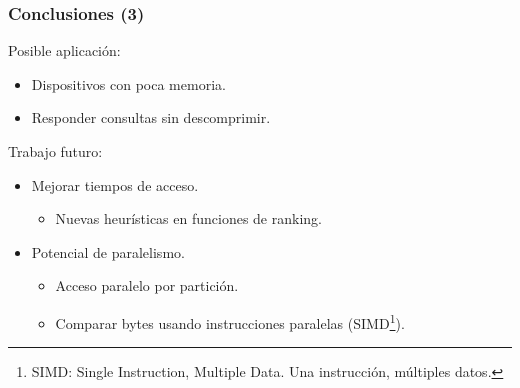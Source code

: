 \begin{frame}
\frametitle{Conclusiones (3)}

Posible aplicación:
\begin{itemize}
	\item Dispositivos con poca memoria.
	\item Responder consultas sin descomprimir.
\end{itemize}

Trabajo futuro:
\begin{itemize}
	\item Mejorar tiempos de acceso.
		\begin{itemize}
			\footnotesize
			\item Nuevas heurísticas en funciones de ranking.
		\end{itemize}
	\item Potencial de paralelismo.
		\begin{itemize}
			\footnotesize
			\item Acceso paralelo por partición.
			\item Comparar bytes usando instrucciones paralelas (SIMD\footnote{SIMD: Single Instruction, Multiple Data. Una instrucción, múltiples datos.}).
		\end{itemize}
\end{itemize}


\end{frame}
